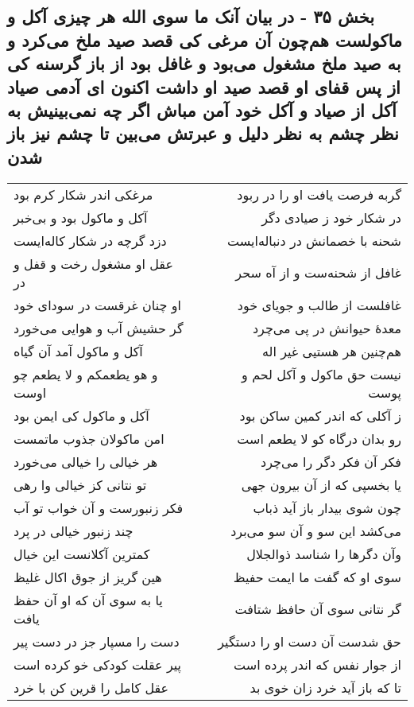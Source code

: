 \begin{center}
\section*{بخش ۳۵ - در بیان آنک ما سوی الله هر چیزی آکل و ماکولست هم‌چون آن مرغی کی قصد صید ملخ می‌کرد و به صید ملخ مشغول می‌بود و غافل بود از باز گرسنه کی از پس قفای او قصد صید او داشت اکنون ای آدمی صیاد آکل از صیاد و آکل خود آمن مباش اگر چه نمی‌بینیش به نظر چشم به نظر دلیل و عبرتش می‌بین تا چشم نیز باز شدن}
\label{sec:sh035}
\begin{longtable}{l p{0.5cm} r}
مرغکی اندر شکار کرم بود
&&
گربه فرصت یافت او را در ربود
\\
آکل و ماکول بود و بی‌خبر
&&
در شکار خود ز صیادی دگر
\\
دزد گرچه در شکار کاله‌ایست
&&
شحنه با خصمانش در دنباله‌ایست
\\
عقل او مشغول رخت و قفل و در
&&
غافل از شحنه‌ست و از آه سحر
\\
او چنان غرقست در سودای خود
&&
غافلست از طالب و جویای خود
\\
گر حشیش آب و هوایی می‌خورد
&&
معدهٔ حیوانش در پی می‌چرد
\\
آکل و ماکول آمد آن گیاه
&&
هم‌چنین هر هستیی غیر اله
\\
و هو یطعمکم و لا یطعم چو اوست
&&
نیست حق ماکول و آکل لحم و پوست
\\
آکل و ماکول کی ایمن بود
&&
ز آکلی که اندر کمین ساکن بود
\\
امن ماکولان جذوب ماتمست
&&
رو بدان درگاه کو لا یطعم است
\\
هر خیالی را خیالی می‌خورد
&&
فکر آن فکر دگر را می‌چرد
\\
تو نتانی کز خیالی وا رهی
&&
یا بخسپی که از آن بیرون جهی
\\
فکر زنبورست و آن خواب تو آب
&&
چون شوی بیدار باز آید ذباب
\\
چند زنبور خیالی در پرد
&&
می‌کشد این سو و آن سو می‌برد
\\
کمترین آکلانست این خیال
&&
وآن دگرها را شناسد ذوالجلال
\\
هین گریز از جوق اکال غلیظ
&&
سوی او که گفت ما ایمت حفیظ
\\
یا به سوی آن که او آن حفظ یافت
&&
گر نتانی سوی آن حافظ شتافت
\\
دست را مسپار جز در دست پیر
&&
حق شدست آن دست او را دستگیر
\\
پیر عقلت کودکی خو کرده است
&&
از جوار نفس که اندر پرده است
\\
عقل کامل را قرین کن با خرد
&&
تا که باز آید خرد زان خوی بد

\end{longtable}
\end{center}
